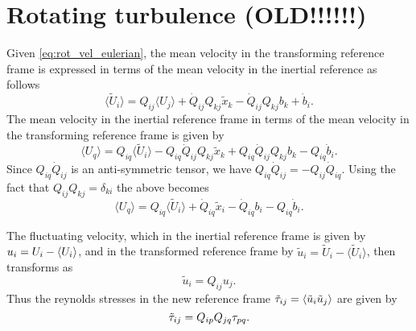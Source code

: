 \documentclass[oneside,a4paper,11pt]{report}
\begin{document}
\section{Rotating turbulence (OLD!!!!!!)}
Given \cref{eq:rot_vel_eulerian}, the mean velocity in the transforming reference frame is expressed in terms of the mean velocity in the inertial reference as follows
\begin{equation}
\label{rot_mean_vel}
\langle \tilde{U}_i \rangle = Q_{ij} \langle U_j \rangle + \dot{Q}_{ij} Q_{kj} \tilde{x}_k - \dot{Q}_{ij} Q_{kj} b_k + \dot{b}_i.
\end{equation}
The mean velocity in the inertial reference frame in terms of the mean velocity in the transforming reference frame is given by
\begin{equation}
\langle U_q \rangle = Q_{iq} \langle \tilde{U}_i \rangle  - Q_{iq}\dot{Q}_{ij} Q_{kj} \tilde{x}_k + Q_{iq}\dot{Q}_{ij} Q_{kj} b_k - Q_{iq} \dot{b}_i.
\end{equation}
Since $Q_{iq}\dot{Q}_{ij}$ is an anti-symmetric tensor, we have $Q_{iq}\dot{Q}_{ij} = -Q_{ij}\dot{Q}_{iq}$. Using the fact that $Q_{ij}Q_{kj} = \delta_{ki}$ the above becomes
\begin{equation}
\langle U_q \rangle = Q_{iq} \langle \tilde{U}_i \rangle + \dot{Q}_{iq} \tilde{x}_i -  \dot{Q}_{iq}b_i - Q_{iq} \dot{b}_i.
\end{equation}

The fluctuating velocity, which in the inertial reference frame is given by $u_i = U_i - \langle U_i \rangle$, and in the transformed reference frame by $\tilde{u}_i = \tilde{U}_i - \langle \tilde{U}_i \rangle$, then transforms as
\begin{equation}
\tilde{u}_i = Q_{ij} u_j .
\end{equation}
Thus the reynolds stresses in the new reference frame $\tilde{\tau}_{ij} = \langle \tilde{u}_i \tilde{u}_j \rangle$ are given by 
\begin{equation}
\tilde{\tau}_{ij} = Q_{ip}Q_{jq} \tau_{pq}.
\end{equation}
\end{document}
